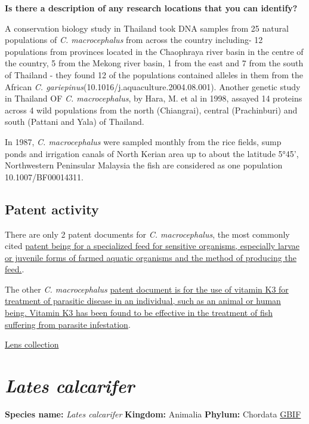 \documentclass[]{book}
\theoremstyle{definition}
\theoremstyle{definition}
\theoremstyle{definition}
\theoremstyle{remark}
\begin{document}
\textbf{Is there a description of any research locations that you can
identify?}

A conservation biology study in Thailand took DNA samples from 25
natural populations of \emph{C. macrocephalus} from across the country
including- 12 populations from provinces located in the Chaophraya river
basin in the centre of the country, 5 from the Mekong river basin, 1
from the east and 7 from the south of Thailand - they found 12 of the
populations contained alleles in them from the African \emph{C.
gariepinus}(10.1016/j.aquaculture.2004.08.001). Another genetic study in
Thailand OF \emph{C. macrocephalus}, by Hara, M. et al in 1998, assayed
14 proteins across 4 wild populations from the north (Chiangrai),
central (Prachinburi) and south (Pattani and Yala) of Thailand.

In 1987, \emph{C. macrocephalus} were sampled monthly from the rice
fields, sump ponds and irrigation canals of North Kerian area up to
about the latitude 5°45', Northwestern Peninsular Malaysia the fish are
considered as one population 10.1007/BF00014311.

\hypertarget{patent-activity}{%
\subsection{Patent activity}\label{patent-activity}}

There are only 2 patent documents for \emph{C. macrocephalus}, the most
commonly cited
\href{https://www.lens.org/lens/patent/WO_2008_084074_A2}{patent being
for a specialized feed for sensitive organisms, especially larvae or
juvenile forms of farmed aquatic organisms and the method of producing
the feed.}.

The other \emph{C. macrocephalus}
\href{https://www.lens.org/lens/patent/WO_2009_063044_A1}{patent
document is for the use of vitamin K3 for treatment of parasitic disease
in an individual, such as an animal or human being. Vitamin K3 has been
found to be effective in the treatment of fish suffering from parasite
infestation}.

\href{https://www.lens.org/lens/collection/24937}{Lens collection}

\hypertarget{lates-calcarifer}{%
\section{\texorpdfstring{\emph{Lates
calcarifer}}{Lates calcarifer}}\label{lates-calcarifer}}

\textbf{Species name:} \emph{Lates calcarifer} \textbf{Kingdom:}
Animalia \textbf{Phylum:} Chordata
\href{https://www.gbif.org/species/2223871}{GBIF}
\end{document}

